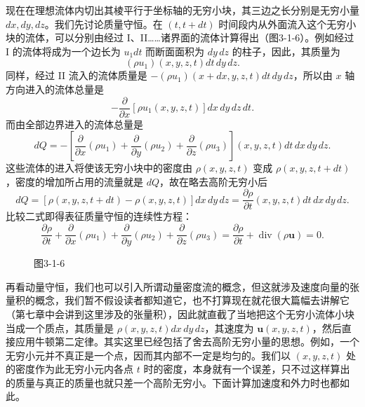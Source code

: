 现在在理想流体内切出其棱平行于坐标轴的无穷小块，其三边之长分别是无穷小量 $dx,dy,dz$。我们先讨论质量守恒。在 $(t,t+dt)$ 时间段内从外面流入这个无穷小块的流体，可以分别由经过 I、II……诸界面的流体计算得出（图3-1-6）。例如经过 I 的流体将成为一个边长为 $u_1dt$ 而断面面积为 $dy\,dz$ 的柱子，因此，其质量为
\[
(\rho u_1)(x,y,z,t)dt\,dy\,dz.
\]
同样，经过 II 流入的流体质量是 $-(\rho u_1)(x+dx,y,z,t)dt\,dy\,dz$，所以由 $x$ 轴方向进入的流体总量是
\[
-\frac{\partial}{\partial x}[\rho u_1(x,y,z,t)]dx\,dy\,dz\,dt.
\]
而由全部边界进入的流体总量是
\[
dQ=-\left[\frac{\partial}{\partial x}(\rho u_1)+\frac{\partial}{\partial y}(\rho u_2)+\frac{\partial}{\partial z}(\rho u_3)\right](x,y,z,t)dt\,dx\,dy\,dz.
\]
这些流体的进入将使该无穷小块中的密度由 $\rho(x,y,z,t)$ 变成 $\rho(x,y,z,t+dt)$，密度的增加所占用的流量就是 $dQ$，故在略去高阶无穷小后
\[
dQ=[\rho(x,y,z,t+dt)-\rho(x,y,z,t)]dx\,dy\,dz
=\frac{\partial\rho}{\partial t}(x,y,z,t)dt\,dx\,dy\,dz.
\]
比较二式即得表征质量守恒的连续性方程：
\begin{equation}
\frac{\partial\rho}{\partial t}+\frac{\partial}{\partial x}(\rho u_1)+\frac{\partial}{\partial y}(\rho u_2)+\frac{\partial}{\partial z}(\rho u_3)
=\frac{\partial\rho}{\partial t}+\operatorname{div}(\rho\boldsymbol u)=0.
\tag{10}
\end{equation}

\begin{figure}[htbp]
\centering
{}
\caption*{图3-1-6}
\end{figure}

再看动量守恒，我们也可以引入所谓动量密度流的概念，但这就涉及速度向量的张量积的概念，我们暂不假设读者都知道它，也不打算现在就花很大篇幅去讲解它（第七章中会讲到这里涉及的张量积），因此就直截了当地把这个无穷小流体小块当成一个质点，其质量是 $\rho(x,y,z,t)dx\,dy\,dz$，其速度为 $\boldsymbol u(x,y,z,t)$，然后直接应用牛顿第二定律。其实这里已经包括了舍去高阶无穷小量的思想。例如，一个无穷小元并不真正是一个点，因而其内部不一定是均匀的。我们以 $(x,y,z,t)$ 处的密度作为此无穷小元内各点 $t$ 时的密度，本身就有一个误差，只不过这样算出的质量与真正的质量也就只差一个高阶无穷小。下面计算加速度和外力时也都如此。

